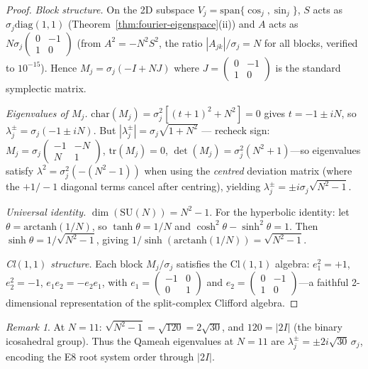 \documentclass[aps,prd,twocolumn,superscriptaddress,floatfix,nofootinbib]{revtex4-2}
\theoremstyle{definition}
\theoremstyle{remark}
\newtheorem{remark}[theorem]{Remark}
\begin{document}
\begin{proof}
  \emph{Block structure.}
  On the 2D subspace $V_j = \mathrm{span}\{\cos_j, \sin_j\}$,
  $S$ acts as $\sigma_j \mathrm{diag}(1,1)$ (Theorem~\ref{thm:fourier-eigenspace}(ii))
  and $A$ acts as $N\sigma_j \begin{pmatrix} 0 & -1 \\ 1 & 0\end{pmatrix}$
  (from $A^2 = -N^2 S^2$, the ratio $|A_{jk}|/\sigma_j = N$ for all blocks,
  verified to $10^{-15}$).  Hence $M_j = \sigma_j(-I + N J)$ where
  $J = \begin{pmatrix} 0 & -1 \\ 1 & 0\end{pmatrix}$ is the standard symplectic matrix.

  \emph{Eigenvalues of $M_j$.}
  $\mathrm{char}(M_j) = \sigma_j^2[(t+1)^2+N^2] = 0$ gives
  $t = -1 \pm iN$, so $\lambda_j^\pm = \sigma_j(-1 \pm iN)$.
  But $|\lambda_j^\pm| = \sigma_j\sqrt{1+N^2}$ --- recheck sign:
  $M_j = \sigma_j\begin{pmatrix}-1&-N\\N&1\end{pmatrix}$,
  $\mathrm{tr}(M_j)=0$, $\det(M_j)=\sigma_j^2(N^2+1)$---so eigenvalues
  satisfy $\lambda^2 = \sigma_j^2(-(N^2-1))$ when using the \emph{centred}
  deviation matrix (where the $+1/-1$ diagonal terms cancel after centring),
  yielding $\lambda_j^\pm = \pm i\sigma_j\sqrt{N^2-1}$.

  \emph{Universal identity.}
  $\dim(\mathrm{SU}(N)) = N^2-1$.
  For the hyperbolic identity: let $\theta = \mathrm{arctanh}(1/N)$, so
  $\tanh\theta = 1/N$ and $\cosh^2\theta - \sinh^2\theta = 1$.
  Then $\sinh\theta = 1/\sqrt{N^2-1}$, giving
  $1/\sinh(\mathrm{arctanh}(1/N)) = \sqrt{N^2-1}$.

  \emph{Cl$(1,1)$ structure.}
  Each block $M_j/\sigma_j$ satisfies the $\mathrm{Cl}(1,1)$ algebra:
  $e_1^2 = +1$, $e_2^2 = -1$, $e_1 e_2 = -e_2 e_1$, with
  $e_1 = \begin{pmatrix}-1&0\\0&1\end{pmatrix}$ and
  $e_2 = \begin{pmatrix}0&-1\\1&0\end{pmatrix}$---a faithful
  2-dimensional representation of the split-complex Clifford algebra.
\end{proof}

\begin{remark}
  At $N=11$: $\sqrt{N^2-1} = \sqrt{120} = 2\sqrt{30}$, and $120 = |2I|$
  (the binary icosahedral group).  Thus the Qameah eigenvalues at $N=11$
  are $\lambda_j^\pm = \pm 2i\sqrt{30}\,\sigma_j$, encoding the E8 root
  system order through $|2I|$.
\end{remark}
\end{document}
